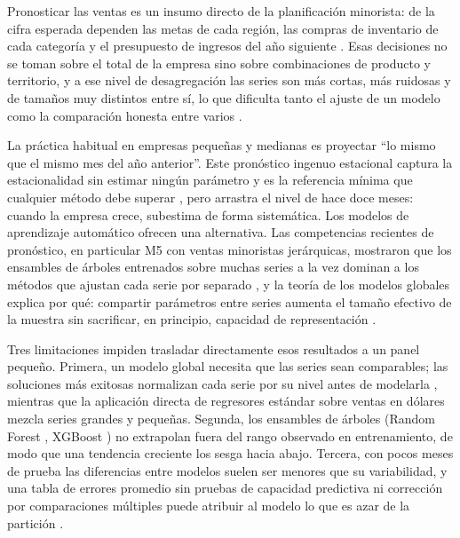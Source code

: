 \documentclass[pdflatex,sn-mathphys-num]{sn-jnl}
\begin{document}
Pronosticar las ventas es un insumo directo de la planificación minorista: de la cifra esperada dependen las metas de cada región, las compras de inventario de cada categoría y el presupuesto de ingresos del año siguiente \cite{fildes2022}. Esas decisiones no se toman sobre el total de la empresa sino sobre combinaciones de producto y territorio, y a ese nivel de desagregación las series son más cortas, más ruidosas y de tamaños muy distintos entre sí, lo que dificulta tanto el ajuste de un modelo como la comparación honesta entre varios \cite{fildes2022,hyndman2021}.

La práctica habitual en empresas pequeñas y medianas es proyectar ``lo mismo que el mismo mes del año anterior''. Este pronóstico ingenuo estacional captura la estacionalidad sin estimar ningún parámetro y es la referencia mínima que cualquier método debe superar \cite{hyndman2021}, pero arrastra el nivel de hace doce meses: cuando la empresa crece, subestima de forma sistemática. Los modelos de aprendizaje automático ofrecen una alternativa. Las competencias recientes de pronóstico, en particular M5 con ventas minoristas jerárquicas, mostraron que los ensambles de árboles entrenados sobre muchas series a la vez dominan a los métodos que ajustan cada serie por separado \cite{makridakis2022}, y la teoría de los modelos globales explica por qué: compartir parámetros entre series aumenta el tamaño efectivo de la muestra sin sacrificar, en principio, capacidad de representación \cite{monteromanso2021}.

Tres limitaciones impiden trasladar directamente esos resultados a un panel pequeño. Primera, un modelo global necesita que las series sean comparables; las soluciones más exitosas normalizan cada serie por su nivel antes de modelarla \cite{salinas2020,smyl2020}, mientras que la aplicación directa de regresores estándar sobre ventas en dólares mezcla series grandes y pequeñas. Segunda, los ensambles de árboles (Random Forest \cite{breiman2001}, XGBoost \cite{chen2016}) no extrapolan fuera del rango observado en entrenamiento, de modo que una tendencia creciente los sesga hacia abajo. Tercera, con pocos meses de prueba las diferencias entre modelos suelen ser menores que su variabilidad, y una tabla de errores promedio sin pruebas de capacidad predictiva \cite{diebold1995,giacomini2006} ni corrección por comparaciones múltiples \cite{holm1979} puede atribuir al modelo lo que es azar de la partición \cite{cerqueira2020}.
\end{document}
